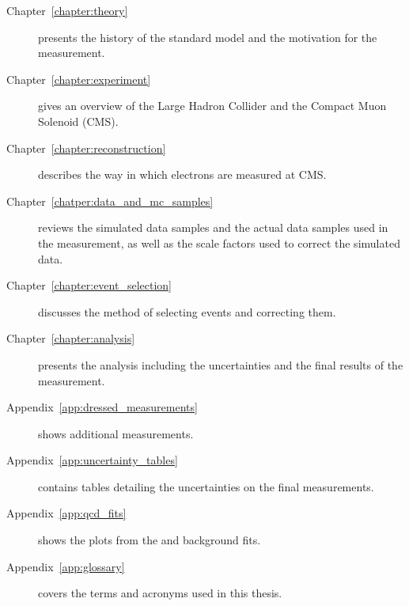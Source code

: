 \begin{description}

    \item[Chapter~\ref{chapter:theory}] presents the history of the standard
        model and the motivation for the measurement.

    \item[Chapter~\ref{chapter:experiment}] gives an overview of the Large
        Hadron Collider and the Compact Muon Solenoid (CMS).

    \item[Chapter~\ref{chapter:reconstruction}] describes the way in which
        electrons are measured at CMS.

    \item[Chapter~\ref{chatper:data_and_mc_samples}] reviews the simulated data
        samples and the actual data samples used in the measurement, as well as
        the scale factors used to correct the simulated data.

    \item[Chapter~\ref{chapter:event_selection}] discusses the method of
        selecting events and correcting them.

    \item[Chapter~\ref{chapter:analysis}] presents the analysis including the
        uncertainties and the final results of the measurement.

    \item[Appendix~\ref{app:dressed_measurements}] shows additional
        measurements.

    \item[Appendix~\ref{app:uncertainty_tables}] contains tables detailing the
        uncertainties on the final measurements.

    \item[Appendix~\ref{app:qcd_fits}] shows the plots from the \QCDjets
        and \wjets background fits.

    \item[Appendix~\ref{app:glossary}] covers the terms and acronyms used in
        this thesis.

\end{description}
